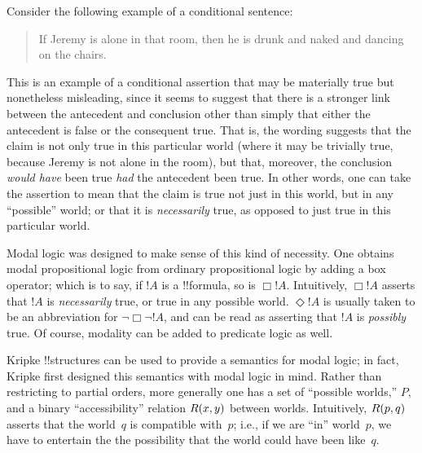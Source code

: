 \documentclass[../../include/open-logic-section]{subfiles}
\begin{document}


Consider the following example of a conditional sentence:
\begin{quote}
  If Jeremy is alone in that room, then he is drunk and naked and
  dancing on the chairs.
\end{quote}
This is an example of a conditional assertion that may be materially
true but nonetheless misleading, since it seems to suggest that there
is a stronger link between the antecedent and conclusion other than
simply that either the antecedent is false or the consequent
true. That is, the wording suggests that the claim is not only true in
this particular world (where it may be trivially true, because Jeremy
is not alone in the room), but that, moreover, the conclusion
\emph{would have} been true \emph{had} the antecedent been true. In
other words, one can take the assertion to mean that the claim is true
not just in this world, but in any ``possible'' world; or that it is
\emph{necessarily} true, as opposed to just true in this particular
world.

Modal logic was designed to make sense of this kind of necessity. One
obtains modal propositional logic from ordinary
propositional logic by adding a box operator; which is to say, if
$!A$ is a !!{formula}, so is $\Box !A$.  Intuitively, $\Box !A$
asserts that $!A$ is \emph{necessarily} true, or true in any possible
world. $\Diamond !A$ is usually taken to be an abbreviation for
$\lnot \Box \lnot !A$, and can be read as asserting that $!A$ is
\emph{possibly} true. Of course, modality can be added to predicate
logic as well.

Kripke !!{structure}s can be used to provide a semantics for modal
logic; in fact, Kripke first designed this semantics with modal logic
in mind. Rather than restricting to partial orders, more generally one
has a set of ``possible worlds,'' $P$, and a binary ``accessibility''
relation $\mathord{R}(x,y)$ between worlds. Intuitively, $\mathord{R}(p,q)$
asserts that the world~$q$ is compatible with~$p$; i.e., if we are
``in'' world~$p$, we have to entertain the the possibility that the
world could have been like~$q$.
\end{document}
